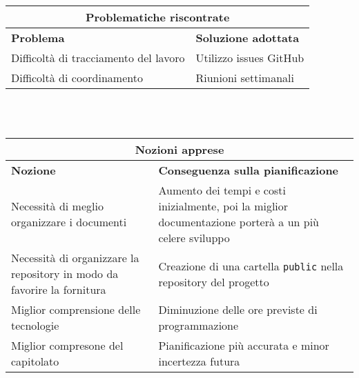 \documentclass[a4paper, 12pt]{article}
\begin{document}
\begin{center}
    \begin{tabularx}{\textwidth}{|X|X|}
        \hline
        \multicolumn{2}{|c|}{\textbf{Problematiche riscontrate}}\\
        \hline
        \hline
        \textbf{Problema} & \textbf{Soluzione adottata}\\
        \hline
        Difficoltà di tracciamento del lavoro & Utilizzo issues GitHub\\
        \hline
        Difficoltà di coordinamento & Riunioni settimanali\\
        \hline
    \end{tabularx}\\[8pt]
    \mbox{}\\
\end{center}

\begin{center}
    \begin{tabularx}{\textwidth}{|X|X|}
        \hline
        \multicolumn{2}{|c|}{\textbf{Nozioni apprese}}\\
        \hline
        \hline
        \textbf{Nozione} & \textbf{Conseguenza sulla pianificazione}\\
        \hline
        Necessità di meglio organizzare i documenti & Aumento dei tempi e costi inizialmente, poi la miglior documentazione porterà a un più celere sviluppo\\
        \hline
        Necessità di organizzare la repository in modo da favorire la fornitura & Creazione di una cartella \texttt{public} nella repository del progetto\\
        \hline
        Miglior comprensione delle tecnologie & Diminuzione delle ore previste di programmazione\\
        \hline
        Miglior compresone del capitolato & Pianificazione più accurata e minor incertezza futura\\
        \hline
    \end{tabularx}\\[8pt]
    \mbox{}\\
\end{center}
\end{document}
